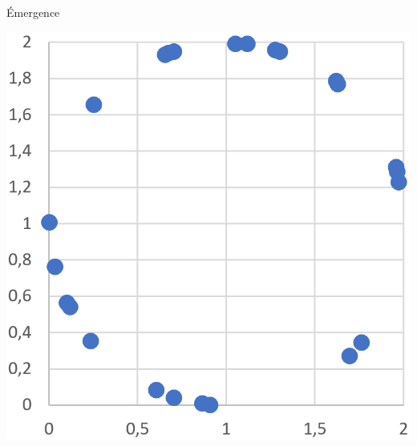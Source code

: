 \documentclass[french]{beamer}
\begin{document}
\begin{frame}{Émergence}
\begin{center}
	\includegraphics[height=0.8\textheight]{circle}
\end{center}
\end{frame}
\end{document}
